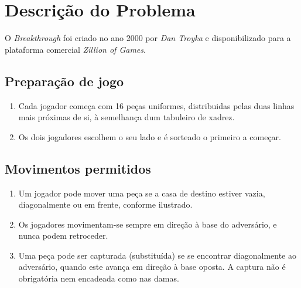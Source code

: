 \documentclass[15pt,a4paper]{article}
\begin{document}


\section{Descrição do Problema}


O \textit{Breakthrough} foi criado no ano 2000 por \textit{Dan Troyka}  e disponibilizado para a plataforma comercial \textit{Zillion of Games}.

\subsection{Preparação de jogo}
\begin{enumerate}
\item Cada jogador começa com 16 peças uniformes, distribuidas pelas duas linhas mais próximas de si, à semelhança dum tabuleiro de xadrez.
\item Os dois jogadores escolhem o seu lado e é sorteado o primeiro a começar.
\end{enumerate}

\subsection{Movimentos permitidos}
\begin{enumerate}
\item Um jogador pode mover uma peça se a casa de destino estiver vazia, diagonalmente ou em frente, conforme ilustrado.
\item Os jogadores movimentam-se sempre em direção à base do adversário, e nunca podem retroceder.
\item Uma peça pode ser capturada (substituída) se se encontrar diagonalmente ao adversário, quando este avança em direção à base oposta. A captura não é obrigatória nem encadeada como nas damas.
\end{enumerate}
\end{document}

